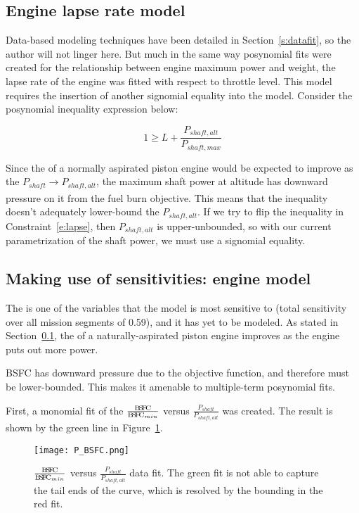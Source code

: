 \subsection{Engine lapse rate model}
\label{s:lapse}

Data-based modeling techniques have been detailed in Section~\ref{s:datafit}, so the author will
not linger here. But much in the same way posynomial fits were created for the relationship between
engine maximum power and weight, the lapse rate of the engine was fitted with respect to throttle level.
This model requires the insertion of another signomial equality into the model. Consider the
posynomial inequality expression below:

\begin{equation}
    \label{e:lapse}
    1 \geq L + \frac{P_{shaft,alt}}{P_{shaft,max}}
\end{equation}

Since the \BSFC of a normally aspirated piston engine would be expected to improve
as the $P_{shaft} \xrightarrow[]{} P_{shaft,alt}$, the maximum shaft
power at altitude has downward pressure on it from the fuel burn objective. This means that the
inequality doesn't adequately lower-bound the $P_{shaft,alt}$. If we try to flip the inequality in
Constraint~\ref{e:lapse}, then $P_{shaft,alt}$ is upper-unbounded, so with our current parametrization
of the shaft power, we must use a signomial equality.

\subsection{Making use of sensitivities: engine \BSFC model}
\label{s:BSFC}

The \BSFC is one of the variables that the model is most sensitive to (total sensitivity over all mission segments of 0.59),
and it has yet to be modeled. As
stated in Section~\ref{s:lapse}, the \BSFC of a naturally-aspirated piston engine improves as the engine puts out more power.

BSFC has downward pressure due to the objective function, and therefore must be lower-bounded. This makes
it amenable to multiple-term posynomial fits.

First, a monomial fit of the $\frac{\BSFC}{\BSFC_{min}}$ versus $\frac{P_{shaft}}{P_{shaft,alt}}$ was created.
The result is shown by the green line in Figure~\ref{f:P_BSFC}.

\begin{figure}
    \centering
    \texttt{[image: P\_BSFC.png]}
    \caption[$\frac{\BSFC}{\BSFC_{min}}$ versus $\frac{P_{shaft}}{P_{shaft,alt}}$ data fit.]{$\frac{\BSFC}{\BSFC_{min}}$ versus $\frac{P_{shaft}}{P_{shaft,alt}}$ data fit. The green fit is
    not able to capture the tail ends of the curve, which is resolved by the bounding in the red fit.}
    \label{f:P_BSFC}
\end{figure}

